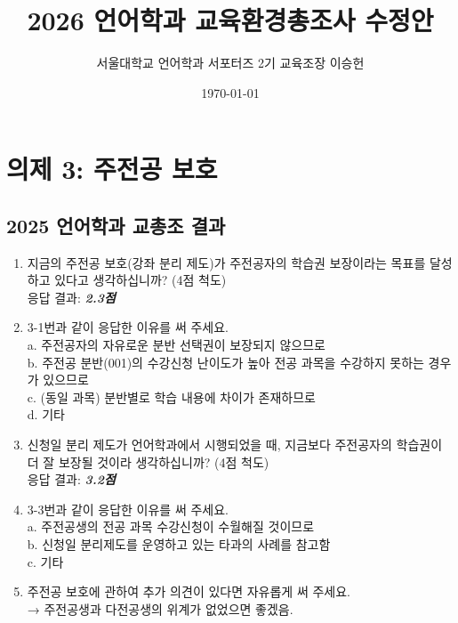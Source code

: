 \documentclass{oblivoir}
\title{\textbf{2026 언어학과 교육환경총조사 수정안}}
\author{서울대학교 언어학과 서포터즈 2기 교육조장 이승헌}
\date{\today}
\begin{document}
\maketitle
\tableofcontents

\newpage
\section{의제 3: 주전공 보호}
\subsection{2025 언어학과 교총조 결과}
\begin{enumerate}
    \item [3-1] 지금의 주전공 보호(강좌 분리 제도)가 주전공자의 학습권 보장이라는 목표를 달성하고 있다고 생각하십니까? (4점 척도) \\ 응답 결과: \textbf{\textit{2.3점}}
    \item [3-2] 3-1번과 같이 응답한 이유를 써 주세요. \\ a. 주전공자의 자유로운 분반 선택권이 보장되지 않으므로 \\ b. 주전공 분반(001)의 수강신청 난이도가 높아 전공 과목을 수강하지 못하는 경우가 있으므로 \\ c. (동일 과목) 분반별로 학습 내용에 차이가 존재하므로 \\ d. 기타
    \item [3-3] 신청일 분리 제도가 언어학과에서 시행되었을 때, 지금보다 주전공자의 학습권이 더 잘 보장될 것이라 생각하십니까? (4점 척도) \\ 응답 결과: \textbf{\textit{3.2점}} 
    \item [3-4] 3-3번과 같이 응답한 이유를 써 주세요. \\ a. 주전공생의 전공 과목 수강신청이 수월해질 것이므로 \\ b. 신청일 분리제도를 운영하고 있는 타과의 사례를 참고함 \\ c. 기타
    \item [3-5] 주전공 보호에 관하여 추가 의견이 있다면 자유롭게 써 주세요. \\ → 주전공생과 다전공생의 위계가 없었으면 좋겠음. 
\end{enumerate}
\end{document}
